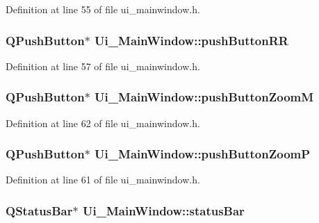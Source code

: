 Definition at line 55 of file ui\-\_\-mainwindow.\-h.

\hypertarget{class_ui___main_window_aa77e9c7bb4f79f14a83b557f52d957ac}{
\subsubsection[{push\-Button\-R\-R}]{\setlength{\rightskip}{0pt plus 5cm}Q\-Push\-Button$\ast$ Ui\-\_\-\-Main\-Window\-::push\-Button\-R\-R}}\label{class_ui___main_window_aa77e9c7bb4f79f14a83b557f52d957ac}


Definition at line 57 of file ui\-\_\-mainwindow.\-h.

\hypertarget{class_ui___main_window_aed7dc656feb43fe5ed8eb834b590b762}{
\subsubsection[{push\-Button\-Zoom\-M}]{\setlength{\rightskip}{0pt plus 5cm}Q\-Push\-Button$\ast$ Ui\-\_\-\-Main\-Window\-::push\-Button\-Zoom\-M}}\label{class_ui___main_window_aed7dc656feb43fe5ed8eb834b590b762}


Definition at line 62 of file ui\-\_\-mainwindow.\-h.

\hypertarget{class_ui___main_window_ad0ad41eba235bd1bc4b8933326d793be}{
\subsubsection[{push\-Button\-Zoom\-P}]{\setlength{\rightskip}{0pt plus 5cm}Q\-Push\-Button$\ast$ Ui\-\_\-\-Main\-Window\-::push\-Button\-Zoom\-P}}\label{class_ui___main_window_ad0ad41eba235bd1bc4b8933326d793be}


Definition at line 61 of file ui\-\_\-mainwindow.\-h.

\hypertarget{class_ui___main_window_a50fa481337604bcc8bf68de18ab16ecd}{
\subsubsection[{status\-Bar}]{\setlength{\rightskip}{0pt plus 5cm}Q\-Status\-Bar$\ast$ Ui\-\_\-\-Main\-Window\-::status\-Bar}}\label{class_ui___main_window_a50fa481337604bcc8bf68de18ab16ecd}


